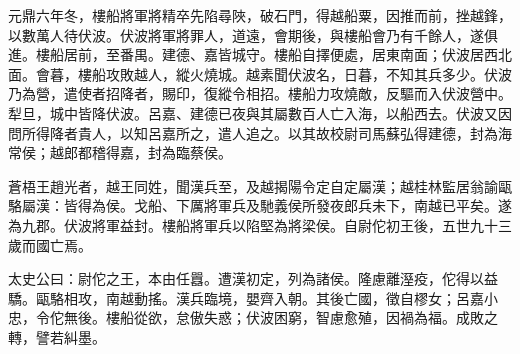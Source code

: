 \begin{pinyinscope}
元鼎六年冬，樓船將軍將精卒先陷尋陜，破石門，得越船粟，因推而前，挫越鋒，以數萬人待伏波。伏波將軍將罪人，道遠，會期後，與樓船會乃有千餘人，遂俱進。樓船居前，至番禺。建德、嘉皆城守。樓船自擇便處，居東南面；伏波居西北面。會暮，樓船攻敗越人，縱火燒城。越素聞伏波名，日暮，不知其兵多少。伏波乃為營，遣使者招降者，賜印，復縱令相招。樓船力攻燒敵，反驅而入伏波營中。犁旦，城中皆降伏波。呂嘉、建德已夜與其屬數百人亡入海，以船西去。伏波又因問所得降者貴人，以知呂嘉所之，遣人追之。以其故校尉司馬蘇弘得建德，封為海常侯；越郎都稽得嘉，封為臨蔡侯。

蒼梧王趙光者，越王同姓，聞漢兵至，及越揭陽令定自定屬漢；越桂林監居翁諭甌駱屬漢：皆得為侯。戈船、下厲將軍兵及馳義侯所發夜郎兵未下，南越已平矣。遂為九郡。伏波將軍益封。樓船將軍兵以陷堅為將梁侯。自尉佗初王後，五世九十三歲而國亡焉。

太史公曰：尉佗之王，本由任囂。遭漢初定，列為諸侯。隆慮離溼疫，佗得以益驕。甌駱相攻，南越動搖。漢兵臨境，嬰齊入朝。其後亡國，徵自樛女；呂嘉小忠，令佗無後。樓船從欲，怠傲失惑；伏波困窮，智慮愈殖，因禍為福。成敗之轉，譬若糾墨。


\end{pinyinscope}